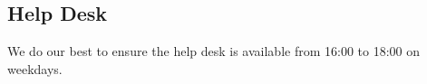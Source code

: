 

\subsection{Help Desk}

We do our best to ensure the help desk is available from 16:00 to 18:00 on weekdays.